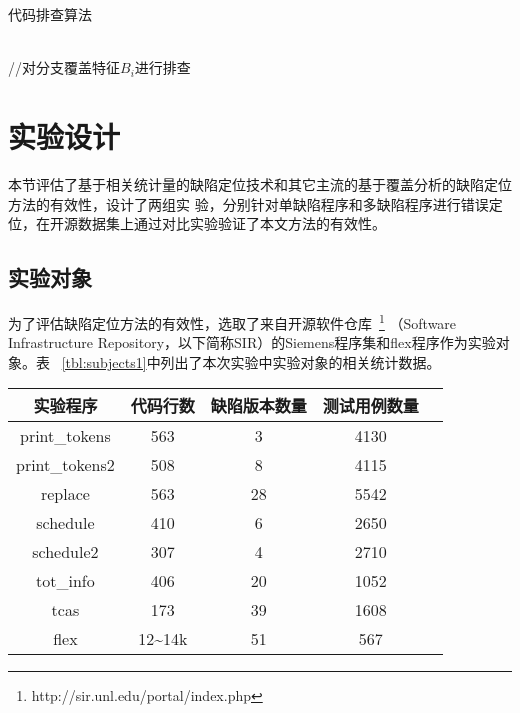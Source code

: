 \begin{algorithm}[H]
\caption{代码排查算法}\label{alg:search}
\\
 {
      //对分支覆盖特征$B_i$进行排查 \\
}
\end{algorithm}

\section{实验设计}
本节评估了基于相关统计量的缺陷定位技术和其它主流的基于覆盖分析的缺陷定位方法的有效性，设计了两组实
验，分别针对单缺陷程序和多缺陷程序进行错误定位，在开源数据集上通过对比实验验证了本文方法的有效性。

\subsection{实验对象}\label{subjects1}

为了评估缺陷定位方法的有效性，选取了来自开源软件仓库~\footnote{http://sir.unl.edu/portal/index.php}
（Software Infrastructure Repository，以下简称SIR）的Siemens程序集和flex程序作为实验对象。表
~\ref{tbl:subjects1}中列出了本次实验中实验对象的相关统计数据。


\begin{center}
\zihaowu
{}\label{tbl:subjects1}
\begin{tabular}{ccccc}
\toprule
实验程序 & 代码行数 & 缺陷版本数量 & 测试用例数量\\ \midrule
print\_tokens & 563 & 3 &4130\\ 
print\_tokens2 & 508 & 8 & 4115\\ 
replace & 563 & 28 & 5542\\ 
schedule & 410 & 6 & 2650\\ 
schedule2 & 307 & 4 & 2710\\ 
tot\_info & 406 & 20 & 1052\\ 
tcas & 173 & 39 & 1608\\ 
flex & 12\textasciitilde14k & 51 & 567\\ \bottomrule
\end{tabular}
\end{center}

